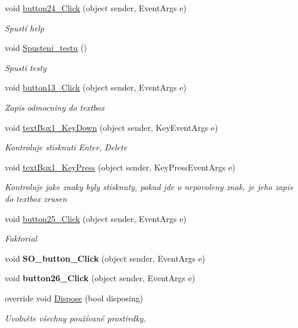 \begin{DoxyCompactItemize}
void \mbox{\hyperlink{class_i_v_s_1_1_calculator_a35aa433b5f36197331eecc260dc495f3}{button24\+\_\+\+Click}} (object sender, Event\+Args e)
\begin{DoxyCompactList}\small\item\em Spustí help \end{DoxyCompactList}\item 
void \mbox{\hyperlink{class_i_v_s_1_1_calculator_a0ce50422b2626bc722577bf9e6b31469}{Spusteni\+\_\+testu}} ()
\begin{DoxyCompactList}\small\item\em Spusti testy \end{DoxyCompactList}\item 
void \mbox{\hyperlink{class_i_v_s_1_1_calculator_a03fca7b882c86953efac6a229c1289db}{button13\+\_\+\+Click}} (object sender, Event\+Args e)
\begin{DoxyCompactList}\small\item\em Zapis odmocniny do textbox \end{DoxyCompactList}\item 
void \mbox{\hyperlink{class_i_v_s_1_1_calculator_a060bd753428b6aff7325f535a6c5445f}{text\+Box1\+\_\+\+Key\+Down}} (object sender, Key\+Event\+Args e)
\begin{DoxyCompactList}\small\item\em Kontroluje stisknuti Enter, Delete \end{DoxyCompactList}\item 
void \mbox{\hyperlink{class_i_v_s_1_1_calculator_a61fcf6cf05550befa610468b0434e99e}{text\+Box1\+\_\+\+Key\+Press}} (object sender, Key\+Press\+Event\+Args e)
\begin{DoxyCompactList}\small\item\em Kontroluje jake znaky byly stisknuty, pokud jde o nepovoleny znak, je jeho zapis do textbox zrusen \end{DoxyCompactList}\item 
void \mbox{\hyperlink{class_i_v_s_1_1_calculator_a59df8db86ef51c3c105143abd36ae3da}{button25\+\_\+\+Click}} (object sender, Event\+Args e)
\begin{DoxyCompactList}\small\item\em Faktorial \end{DoxyCompactList}\item 
\mbox{\label{class_i_v_s_1_1_calculator_a6dab5899635143716cb5528ce502684d}} 
void {\bfseries S\+O\+\_\+button\+\_\+\+Click} (object sender, Event\+Args e)
\item 
\mbox{\label{class_i_v_s_1_1_calculator_a50b09cd75e77f655a9e082b8df2ad4c5}} 
void {\bfseries button26\+\_\+\+Click} (object sender, Event\+Args e)
\item 
override void \mbox{\hyperlink{class_i_v_s_1_1_calculator_aefacad0176c6b732e4fdd19829c3a37a}{Dispose}} (bool disposing)
\begin{DoxyCompactList}\small\item\em Uvolněte všechny používané prostředky. \end{DoxyCompactList}\end{DoxyCompactItemize}
